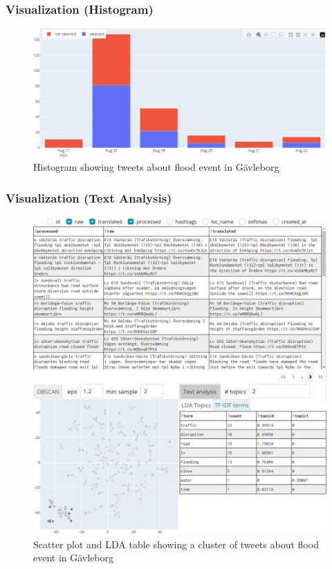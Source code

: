 \documentclass{beamer}
\begin{document}
  \begin{frame}[t]
    \frametitle{Visualization (Histogram)}
\begin{figure}[H]
  \begin{center}
    \includegraphics[width=\textwidth]{../report/images/gavle_histogram.png}
  \end{center}
  \caption{Histogram showing tweets about flood event in Gävleborg}
  \label{fig:gavle_histogram}
\end{figure}
  \end{frame}

  \begin{frame}[t]
    \frametitle{Visualization (Text Analysis)}
\begin{figure}[H]
  \begin{center}
    \includegraphics[width=0.9\columnwidth, trim={0cm 0cm 0cm 14.5cm},clip]{../report//images/gavle_text_analysis.png}
  \end{center}
  \caption{Scatter plot and LDA table showing a cluster of tweets about flood event in Gävleborg}
\end{figure}
    
  \end{frame}
\end{document}
